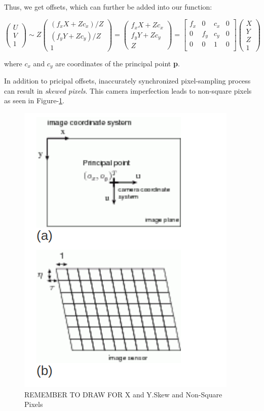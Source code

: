\documentclass[a4paper]{report}
\numberwithin{figure}{section}
\begin{document}
Thus, we get offsets, which can further be added into our function:

\begin{equation}
  \begin{pmatrix}
    U\\
    V\\
    1
  \end{pmatrix}
  \sim
  Z
  \begin{pmatrix}
    (f_xX + Z c_x)/Z\\
    (f_yY + Z c_y)/Z\\
    1
  \end{pmatrix}
  =
  \begin{pmatrix}
    f_xX + Z c_x\\
    f_yY + Z c_y\\
    Z
  \end{pmatrix}
  =
  \begin{bmatrix}
    f_x & 0 & c_x & 0\\
    0 & f_y & c_y & 0\\
    0 & 0 & 1 & 0\\
  \end{bmatrix}
  \begin{pmatrix}
    X\\
    Y\\
    Z\\
    1
  \end{pmatrix}
\end{equation} \label{eq:proj_func_w_f_c}

where $c_x$ and $c_y$ are coordinates of the principal point \textbf{p}.

In addition to pricipal offsets, inaccurately synchronized pixel-sampling 
process can result in \textit{skewed pixels}. This camera imperfection leads to 
non-square pixels as seen in Figure-\ref{fig:skewed}.

\begin{figure}[H]
	\centering
  \includegraphics[width=0.5\linewidth,natwidth=640,natheight=640]
  {fig/ref_imgs/skew.png}
  \caption{REMEMBER TO DRAW FOR X and Y.Skew and Non-Square Pixels}
	\label{fig:skewed}
\end{figure}
\end{document}
